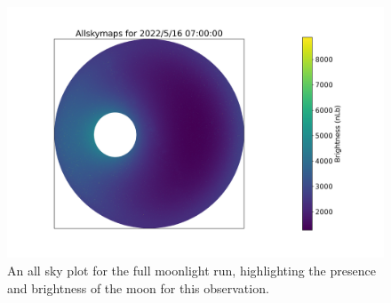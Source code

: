 \begin{table}[h]
    \centering
    \caption{Observation Parameters for the Four Eta Carinae Runs.  The observing Altitude (ALT) and Azimuth (AZ) are presented, along with the simulated source Right Ascension (RA) and Declination (DEC). The moonlit Eta Carinae runs are at a low altitude that an IACT would not normally observe at, but since the \textit{nsb} model does not take into account atmospheric properties this is not consequential. Times are in UTC.}
    \label{tab:etacar_params}
\end{table}

\begin{figure}[ht]
\begin{centering}
\includegraphics[width=0.8\columnwidth]{./figures/allskyetacarextreme.png}
\caption{An all sky plot for the full moonlight run, highlighting the presence and brightness of the moon for this observation.}
\label{fig:allskyetacarextreme}
\end{centering}
\end{figure}

